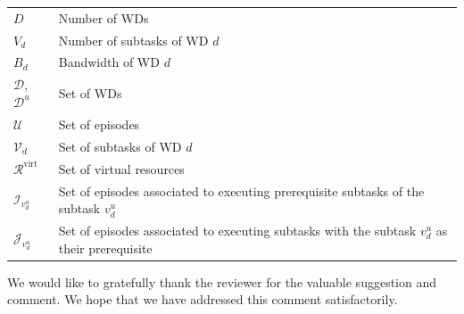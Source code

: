 \documentclass[12pt,draftclsnofoot,onecolumn]{IEEEtran}
\newenvironment{my}[2]%
{\begin{list}{}%
{\setlength{\rightmargin}{#1}\setlength{\leftmargin}{#2}}%


 \item[]{}

} {\end{list}}
\begin{document}
\begin{enumerate}
\begin{my}{0cm}{0cm}
{\begin{table}[h]
{\begin{tabular}{ |p{2cm}|p{12cm}|  }
				$D$ & Number of WDs \\
				$V_d$ & Number of subtasks of WD $d$ \\
				$B_d$ & Bandwidth of WD $d$ \\
				$\mathcal{D}$, $\mathcal{D}^u$ & Set of WDs \\ 
				$\mathcal{U}$ & Set of episodes \\
				$\mathcal{V}_d$ & Set of subtasks of WD $d$ \\
				$\mathcal{R}^{\text{virt}}$ & Set of virtual resources \\
				$\mathcal{I}_{v_d^u}$ & Set of episodes associated to executing prerequisite subtasks of the subtask $v_d^u$ \\
				$\mathcal{J}_{v_d^u}$ & Set of episodes associated to executing subtasks with the subtask $v_d^u$ as their prerequisite \\
				\hline
			\end{tabular}}
	\end{table}}
\end{my}


\end{enumerate}

We would like to gratefully thank the reviewer for the valuable suggestion and comment. We hope that we have addressed this comment satisfactorily. \newpage
\end{document}
